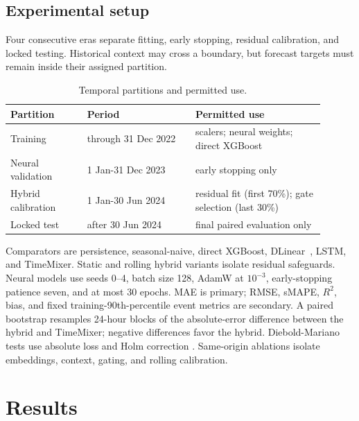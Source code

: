 \documentclass[sn-mathphys-num]{sn-jnl}
\begin{document}
\subsection{Experimental setup}
\label{sec:setup}

Four consecutive eras separate fitting, early stopping, residual calibration,
and locked testing. Historical context may cross a boundary, but forecast
targets must remain inside their assigned partition.

\begin{table}[tbp]
\centering
\caption{Temporal partitions and permitted use.}
\label{tab:splits}
\small
\begin{tabular}{p{0.22\linewidth}p{0.31\linewidth}p{0.37\linewidth}}
\toprule
Partition & Period & Permitted use \\
\midrule
Training & through 31 Dec 2022 & scalers; neural weights; direct XGBoost \\
Neural validation & 1 Jan-31 Dec 2023 & early stopping only \\
Hybrid calibration & 1 Jan-30 Jun 2024 & residual fit (first 70\%); gate selection (last 30\%) \\
Locked test & after 30 Jun 2024 & final paired evaluation only \\
\bottomrule
\end{tabular}
\end{table}

Comparators are persistence, seasonal-naive, direct XGBoost,
DLinear~\cite{zeng2023dlinear}, LSTM, and TimeMixer. Static and rolling hybrid
variants isolate residual safeguards. Neural models use seeds 0--4, batch size
128, AdamW at \(10^{-3}\), early-stopping patience seven, and at most 30
epochs. MAE is primary; RMSE, sMAPE, \(R^2\), bias, and fixed
training-90th-percentile event metrics are secondary. A paired bootstrap
resamples 24-hour blocks of the absolute-error difference between the hybrid
and TimeMixer; negative differences favor the hybrid. Diebold-Mariano tests
use absolute loss and Holm correction
\cite{diebold1995accuracy}. Same-origin ablations isolate embeddings, context,
gating, and rolling calibration.

\section{Results}
\label{sec:results}
\end{document}
